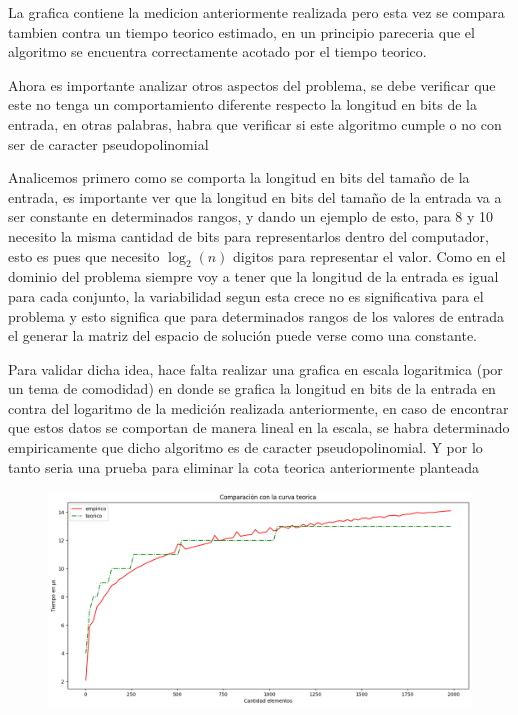 La grafica contiene la medicion anteriormente realizada pero esta vez se compara tambien contra un tiempo teorico estimado, en un principio pareceria que el algoritmo se encuentra correctamente acotado por el tiempo teorico.

Ahora es importante analizar otros aspectos del problema, se debe verificar que este no tenga un comportamiento diferente respecto la longitud en bits de la entrada, en otras palabras, habra que verificar si este algoritmo cumple o no con ser de caracter pseudopolinomial

Analicemos primero como se comporta la longitud en bits del tamaño de la entrada, es importante ver que la longitud en bits del tamaño de la entrada va a ser constante en determinados rangos, y dando un ejemplo de esto, para 8 y 10 necesito la misma cantidad de bits para representarlos dentro del computador, esto es pues que necesito $\log_2(n)
$ digitos para representar el valor. Como en el dominio del problema siempre voy a tener que la longitud de la entrada es igual para cada conjunto, la variabilidad segun esta crece no es significativa para el problema y esto significa que para determinados rangos de los valores de entrada el generar la matriz del espacio de solución puede verse como una constante. 

Para validar dicha idea, hace falta realizar una grafica en escala logaritmica (por un tema de comodidad) en donde se grafica la longitud en bits de la entrada en contra del logaritmo de la medición realizada anteriormente, en caso de encontrar que estos datos se comportan de manera lineal en la escala, se habra determinado empiricamente que dicho algoritmo es de caracter pseudopolinomial. Y por lo tanto seria una prueba para eliminar la cota teorica anteriormente planteada

\begin{figure}[H]
    \centering
    \includegraphics[width=1\textwidth]{graficos/logaritmica.png}
\end{figure}

